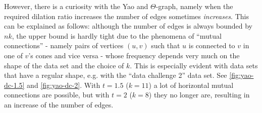 \documentclass[a4paper,twoside,11pt,hidelinks]{article}
\theoremstyle{plain}
\theoremstyle{definition}  %
\begin{document}
However, there is a curiosity with the Yao and $\Theta$-graph, namely when the required dilation ratio increases the number of edges sometimes \emph{increases}. This can be explained as follows: although the number of edges is always bounded by $nk$, the upper bound is hardly tight due to the phenomena of ``mutual connections'' - namely pairs of vertices $(u, v)$ such that $u$ is connected to $v$ in one of $v$'s cones and vice versa - whose frequency depends very much on the shape of the data set and the choice of $k$. This is especially evident with data sets that have a regular shape, e.g. with the ``data challenge 2'' data set. See \autoref{fig:yao-dc-1.5} and \autoref{fig:yao-dc-2}. With $t = 1.5$ ($k = 11$) a lot of horizontal mutual connections are possible, but with $t = 2$ ($k = 8$) they no longer are, resulting in an increase of the number of edges.
\end{document}
